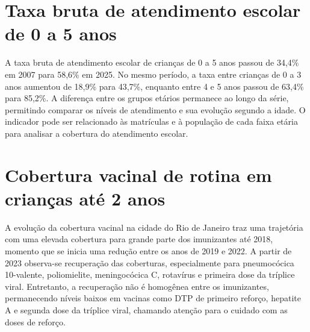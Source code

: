 
\section{Taxa bruta de atendimento escolar de 0 a 5 anos}


A taxa bruta de atendimento escolar de crianças de 0 a 5 anos passou de 34,4\% em 2007 para 58,6\% em 2025. No mesmo período, a taxa entre crianças de 0 a 3 anos aumentou de 18,9\% para 43,7\%, enquanto entre 4 e 5 anos passou de 63,4\% para 85,2\%. A diferença entre os grupos etários permanece ao longo da série, permitindo comparar os níveis de atendimento e sua evolução segundo a idade. O indicador pode ser relacionado às matrículas e à população de cada faixa etária para analisar a cobertura do atendimento escolar.


\section{Cobertura vacinal de rotina em crianças até 2 anos}


A evolução da cobertura vacinal na cidade do Rio de Janeiro traz uma trajetória com uma elevada cobertura para grande parte dos imunizantes até 2018, momento que se inicia uma redução entre os anos de 2019 e 2022. A partir de 2023 observa-se recuperação das coberturas, especialmente para pneumocócica 10-valente, poliomielite, meningocócica C, rotavírus e primeira dose da tríplice viral. Entretanto, a recuperação não é homogênea entre os imunizantes, permanecendo níveis baixos em vacinas como DTP de primeiro reforço, hepatite A e segunda dose da tríplice viral, chamando atenção para o cuidado com as doses de reforço.


